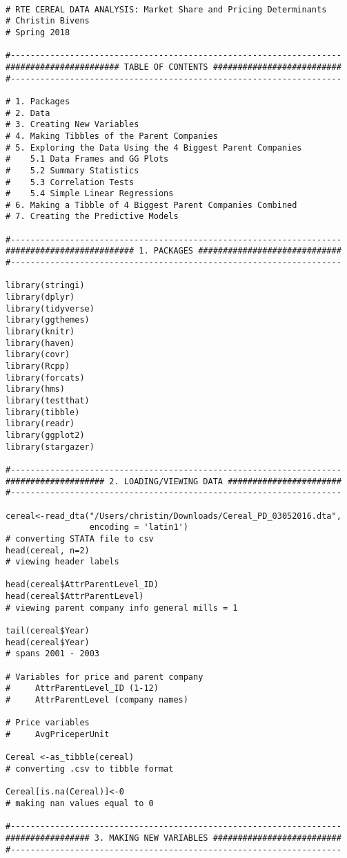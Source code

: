 \documentclass[12pt,english]{article}
\begin{document}
\begin{lstlisting}

# RTE CEREAL DATA ANALYSIS: Market Share and Pricing Determinants
# Christin Bivens
# Spring 2018 

#-------------------------------------------------------------------
####################### TABLE OF CONTENTS ##########################
#-------------------------------------------------------------------

# 1. Packages
# 2. Data
# 3. Creating New Variables
# 4. Making Tibbles of the Parent Companies
# 5. Exploring the Data Using the 4 Biggest Parent Companies
#    5.1 Data Frames and GG Plots
#    5.2 Summary Statistics
#    5.3 Correlation Tests
#    5.4 Simple Linear Regressions
# 6. Making a Tibble of 4 Biggest Parent Companies Combined
# 7. Creating the Predictive Models

#-------------------------------------------------------------------
########################## 1. PACKAGES #############################
#-------------------------------------------------------------------

library(stringi)
library(dplyr)
library(tidyverse)
library(ggthemes)
library(knitr)
library(haven)
library(covr)
library(Rcpp)
library(forcats)
library(hms)
library(testthat)
library(tibble)
library(readr)
library(ggplot2)
library(stargazer)

#-------------------------------------------------------------------
#################### 2. LOADING/VIEWING DATA #######################
#-------------------------------------------------------------------

cereal<-read_dta("/Users/christin/Downloads/Cereal_PD_03052016.dta",
                 encoding = 'latin1')
# converting STATA file to csv
head(cereal, n=2)
# viewing header labels

head(cereal$AttrParentLevel_ID)
head(cereal$AttrParentLevel)
# viewing parent company info general mills = 1

tail(cereal$Year)
head(cereal$Year)
# spans 2001 - 2003

# Variables for price and parent company
#     AttrParentLevel_ID (1-12)
#     AttrParentLevel (company names)

# Price variables
#     AvgPriceperUnit

Cereal <-as_tibble(cereal)
# converting .csv to tibble format

Cereal[is.na(Cereal)]<-0
# making nan values equal to 0

#-------------------------------------------------------------------
################# 3. MAKING NEW VARIABLES ##########################
#-------------------------------------------------------------------


\end{lstlisting}
\end{document}
